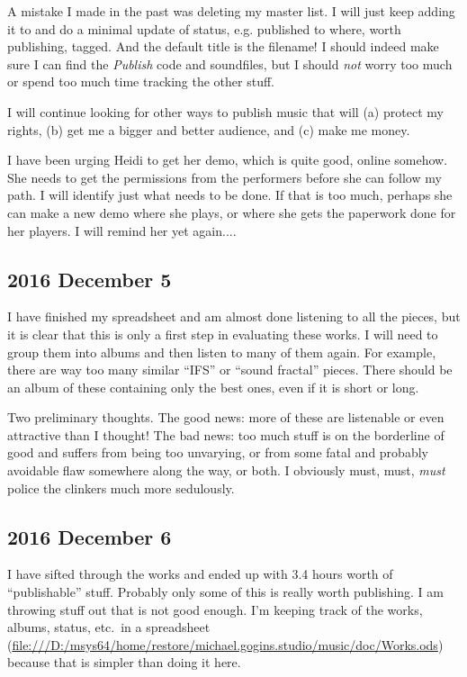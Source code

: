 \documentclass[english,11pt,letterpaper,onecolumn]{scrartcl}
\begin{document}
A mistake I made in the past was deleting my master list. I will just keep adding it to and do a minimal update of status, e.g. published to where, worth publishing, tagged. And the default title is the filename! I should indeed make sure I can find the \emph{Publish} code and soundfiles, but I should \emph{not} worry too much or spend too much time tracking the other stuff.

I will continue looking for other ways to publish music that will (a) protect my rights, (b) get me a bigger and better audience, and (c) make me money.

I have been urging Heidi to get her demo, which is quite good, online somehow. She needs to get the permissions from the performers before she can follow my path. I will identify just what needs to be done. If that is too much, perhaps she can make a new demo where she plays, or where she gets the paperwork done for her players. I will remind her yet again....

\subsection*{2016 December 5}

I have finished my spreadsheet and am almost done listening to all the pieces, but it is clear that this is only a first step in evaluating these works. I will need to group them into albums and then listen to many of them again. For example, there are way too many similar ``IFS'' or ``sound fractal'' pieces. There should be an album of these containing only the best ones, even if it is short or long.

Two preliminary thoughts. The good news: more of these are listenable or even attractive than I thought! The bad news: too much stuff is on the borderline of good and suffers from being too unvarying, or from some fatal and probably avoidable flaw somewhere along the way, or both. I obviously must, must, \emph{must} police the clinkers much more sedulously.

\subsection*{2016 December 6}

I have sifted through the works and ended up with 3.4 hours worth of ``publishable'' stuff. Probably only some of this is really worth publishing. I am throwing stuff out that is not good enough. I'm keeping track of the works, albums, status, etc.\ in a spreadsheet (\url{file:///D:/msys64/home/restore/michael.gogins.studio/music/doc/Works.ods}) because that is simpler than doing it here.
\end{document}
